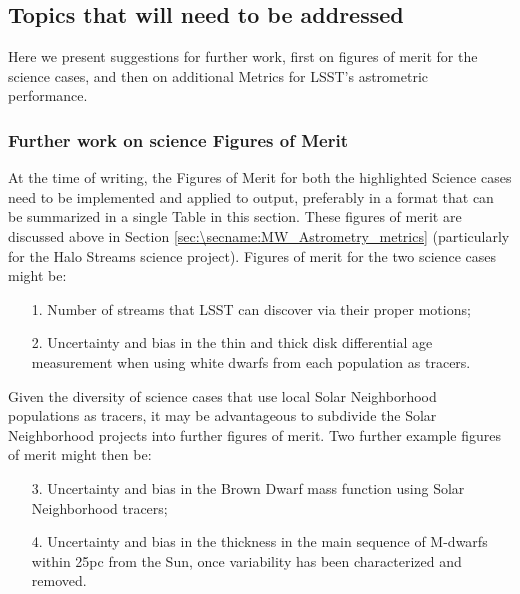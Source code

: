 \subsection{Topics that will need to be addressed}
\label{sec:\secname:MW_Astrometry_furtherwork}

Here we present suggestions for further work, first on figures of
merit for the science cases, and then on additional Metrics for LSST's
astrometric performance.

\subsubsection{Further work on science Figures of Merit}

At the time of writing, the Figures of Merit for both the highlighted
Science cases need to be implemented and applied to \OpSim output,
preferably in a format that can be summarized in a single Table in
this section. These figures of merit are discussed above in Section
\ref{sec:\secname:MW_Astrometry_metrics} (particularly for the Halo
Streams science project). Figures of merit for the two science cases
might be:
\begin{itemize}
  \item[1.] Number of streams that LSST can discover via their proper motions;
\item[2.] Uncertainty and bias in the thin and thick disk differential age measurement when using white dwarfs from each population as tracers.
\end{itemize}

Given the diversity of science cases that use local Solar Neighborhood
populations as tracers, it may be advantageous to subdivide the Solar
Neighborhood projects into further figures of merit. Two further example
figures of merit might then be:
\begin{itemize}
  \item[3.] Uncertainty and bias in the Brown Dwarf mass function using Solar Neighborhood tracers;
   \item[4.] Uncertainty and bias in the thickness in the main sequence of M-dwarfs within 25pc from the Sun, once variability has been characterized and removed.
\end{itemize}


